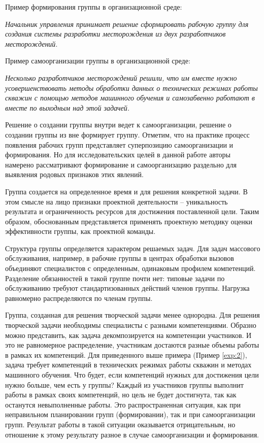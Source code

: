 Пример формирования группы в организационной среде: 

\textit{Начальник управления принимает решение сформировать рабочую группу для создания системы разработки месторождения из двух разработчиков месторождений}. 

Пример самоорганизации группы в организационной среде: 

\textit{Несколько разработчиков месторождений решили, что им вместе нужно усовершенствовать методы обработки данных о технических режимах работы скважин с помощью методов машинного обучения и самозабвенно работают в вместе по выходным над этой задачей.
} \label{exp:2}

Решение о создании группы внутри ведет к самоорганизации, решение о создании группы из вне формирует группу. 
Отметим, что на практике процесс появления рабочих групп представляет суперпозицию самоорганизации и формирования. 
Но для исследовательских целей в данной работе авторы намерено рассматривают формирование и самоорганизацию раздельно для выявления родовых признаков этих явлений.

Группа создается на определенное время и для решения конкретной задачи. 
В этом смысле на лицо признаки проектной деятельности – уникальность результата и ограниченность ресурсов для достижения поставленной цели. 
Таким образом, обоснованным представляется применять проектную методику оценки эффективности группы, как проектной команды. 

Структура группы определяется характером решаемых задач. 
Для задач массового обслуживания, например, в рабочие группы в центрах обработки вызовов объединяют специалистов с определенным, одинаковым профилем компетенций. 
Разделение обязанностей в такой группе почти нет: типовые задачи по обслуживанию требуют стандартизованных действий членов группы.
Нагрузка равномерно распределяются по членам группы.

Группа, созданная для решения творческой задачи менее однородна. 
Для решения творческой задачи необходимы специалисты с разными компетенциями. 
Образно можно представить, как задача декомпозируется на компетенции участников.
И это не равномерное распределение, участникам достаются разные объемы работы в рамках их компетенций. 
Для приведенного выше примера (Пример  \ref{exp:2}), задача требует компетенций в технических режимах работы скважин и методах машинного обучения. 
Что будет, если компетенций нужных для достижения цели нужно больше, чем есть у группы? 
Каждый из участников группы выполнит работы в рамках своих компетенций, но цель не будет достигнута, так как останутся невыполненные работы. 
Это распространенная ситуация, как при неправильном планировании групп (формировании), так и при самоорганизации групп. 
Результат работы в такой ситуации оказывается отрицательным, но отношение к этому результату разное в случае самоорганизации и формирования.

